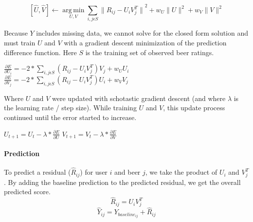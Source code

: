 \documentclass[12pt]{article}
\DeclareMathOperator*{\argmin}{arg\,min}
\begin{document}
$$ [\hat{U}, \hat{V}] \leftarrow \argmin\limits_{U,V}\sum\limits_{i,j \epsilon S} {\|R_{ij} - U_i V_j^T\|}^2 + w_U\|U\|^2 + w_V\|V\|^2$$

Because $Y$ includes missing data, we cannot solve for the closed form solution and must train $U$ and $V$ with a gradient descent minimization of the prediction difference function. Here $S$ is the training set of observed beer ratings. \\

\begin{center}
$ \frac{\partial E}{\partial U_i} = -2 * \sum\limits_{i,j \epsilon S} (R_{ij} - U_i V_j^T) V_j + w_U U_i $ \hspace{1cm} $ \frac{\partial E}{\partial V_j} = -2 * \sum\limits_{i,j \epsilon S} (R_{ij} - U_i V_j^T) U_i + w_V V_j$\\
\end{center}




Where $U$ and $V$ were updated with schotastic gradient descent (and where $\lambda$ is the learning rate / step size). While training $U$ and $V$, this update process continued until the error started to increase.
\begin{center}
$ U_{t+1} = U_t - \lambda * \frac{\partial E}{\partial U}$ \hspace{2cm} $V_{t+1} = V_t - \lambda * \frac{\partial E}{\partial V}$
\end{center}
\paragraph{Prediction} To predict a residual ($\hat R_{ij}$) for user $i$ and beer $j$, we take the product of $U_i$ and $V_j^T$. By adding the baseline prediction to the predicted residual, we get the overall predicted score.
$$ \hat{R}_{ij} = U_i V_j^T $$
$$ \hat{Y}_{ij} = Y_{baseline_{ij}} + \hat{R}_{ij} $$
\end{document}
